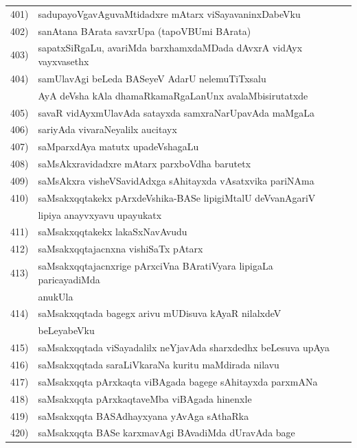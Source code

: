\begin{longtable}{@{}cp{7.4cm}r}
401) & sadupayoVgavAguvaMtidadxre mAtarx viSayavaninxDabeVku & \pageref{page252}\\
402) & sanAtana BArata savxrUpa (tapoVBUmi BArata) & \pageref{page103}\\
403) & sapatxSiRgaLu, avariMda barxhamxdaMDada dAvxrA vidAyx vayxvasethx & \pageref{page92a}\\
404) & samUlavAgi beLeda BASeyeV AdarU nelemuTiTxsalu & \\
     & AyA deVsha kAla dhamaRkamaRgaLanUnx avalaMbisirutatxde & \pageref{page196}\\
405) & savaR vidAyxmUlavAda satayxda samxraNarUpavAda maMgaLa & \pageref{20e}\\
406) & sariyAda vivaraNeyalilx aucitayx & \pageref{page117b}\\
407) & saMparxdAya matutx upadeVshagaLu & \pageref{page105a}\\
408) & saMsAkxravidadxre mAtarx parxboVdha barutetx & \pageref{page124}\\
409) & saMsAkxra visheVSavidAdxga sAhitayxda vAsatxvika pariNAma & \pageref{page213}\\
410) & saMsakxqqtakekx pArxdeVshika-BASe lipigiMtalU deVvanAgariV & \\
     & lipiya anayvxyavu upayukatx & \pageref{page33f}\\
411) & saMsakxqqtakekx lakaSxNavAvudu & \pageref{page2}\\
412) & saMsakxqqtajacnxna vishiSaTx pAtarx & \pageref{page30a}\\
413) & saMsakxqqtajacnxrige pArxciVna BAratiVyara lipigaLa paricayadiMda & \\
     & anukUla & \pageref{page52}\\
414) & saMsakxqqtada bagegx arivu mUDisuva kAyaR nilalxdeV& \\
     & beLeyabeVku &\pageref{page21a}\\
415) & saMsakxqqtada viSayadalilx neYjavAda sharxdedhx beLesuva upAya & \pageref{page31b}\\
416) & saMsakxqqtada saraLiVkaraNa kuritu maMdirada nilavu & \pageref{page35}\\
417) & saMsakxqqta pArxkaqta viBAgada bagege sAhitayxda parxmANa & \pageref{page12a}\\
418) & saMsakxqqta pArxkaqtaveMba viBAgada hinenxle & \pageref{page11}\\
419) & saMsakxqqta BASAdhayxyana yAvAga sAthaRka & \pageref{page27}\\
420) & saMsakxqqta BASe karxmavAgi BAvadiMda dUravAda bage & \pageref{page15}\\

\end{longtable}
